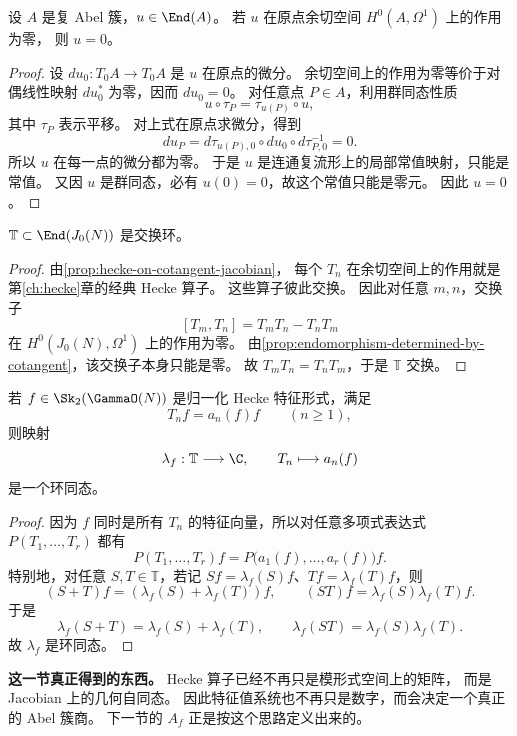 \begin{proposition}
\label{prop:endomorphism-determined-by-cotangent}
设 $A$ 是复 Abel 簇，$u\in\End(A)$。
若 $u$ 在原点余切空间 $H^0(A,\Omega^1)$ 上的作用为零，
则 $u=0$。
\end{proposition}

\begin{proof}
设 $du_0:T_0A\to T_0A$ 是 $u$ 在原点的微分。
余切空间上的作用为零等价于对偶线性映射 $du_0^*$ 为零，因而 $du_0=0$。
对任意点 $P\in A$，利用群同态性质
\[
  u\circ \tau_P=\tau_{u(P)}\circ u,
\]
其中 $\tau_P$ 表示平移。
对上式在原点求微分，得到
\[
  du_P=d\tau_{u(P),0}\circ du_0\circ d\tau_{P,0}^{-1}=0.
\]
所以 $u$ 在每一点的微分都为零。
于是 $u$ 是连通复流形上的局部常值映射，只能是常值。
又因 $u$ 是群同态，必有 $u(0)=0$，故这个常值只能是零元。
因此 $u=0$。
\end{proof}

\begin{corollary}
\label{cor:hecke-algebra-commutative-jacobian}
$\mathbb T\subset \End(J_0(N))$ 是交换环。
\end{corollary}

\begin{proof}
由\cref{prop:hecke-on-cotangent-jacobian}，
每个 $T_n$ 在余切空间上的作用就是第\ref{ch:hecke}章的经典 Hecke 算子。
这些算子彼此交换。
因此对任意 $m,n$，交换子
\[
  [T_m,T_n]=T_mT_n-T_nT_m
\]
在 $H^0(J_0(N),\Omega^1)$ 上的作用为零。
由\cref{prop:endomorphism-determined-by-cotangent}，该交换子本身只能是零。
故 $T_mT_n=T_nT_m$，于是 $\mathbb T$ 交换。
\end{proof}

\begin{proposition}
\label{prop:eigenform-gives-character}
若 $f\in \Sk_2(\GammaO(N))$ 是归一化 Hecke 特征形式，满足
\[
  T_nf=a_n(f)f \qquad (n\ge 1),
\]
则映射
\[
  \lambda_f:\mathbb T\longrightarrow \C,
  \qquad
  T_n\longmapsto a_n(f)
\]
是一个环同态。
\end{proposition}

\begin{proof}
因为 $f$ 同时是所有 $T_n$ 的特征向量，所以对任意多项式表达式 $P(T_1,\dots,T_r)$ 都有
\[
  P(T_1,\dots,T_r)f=P\bigl(a_1(f),\dots,a_r(f)\bigr)f.
\]
特别地，对任意 $S,T\in\mathbb T$，若记 $Sf=\lambda_f(S)f$、$Tf=\lambda_f(T)f$，则
\[
  (S+T)f=(\lambda_f(S)+\lambda_f(T))f,
  \qquad
  (ST)f=\lambda_f(S)\lambda_f(T)f.
\]
于是
\[
  \lambda_f(S+T)=\lambda_f(S)+\lambda_f(T),
  \qquad
  \lambda_f(ST)=\lambda_f(S)\lambda_f(T).
\]
故 $\lambda_f$ 是环同态。
\end{proof}

\textbf{这一节真正得到的东西。}
Hecke 算子已经不再只是模形式空间上的矩阵，
而是 Jacobian 上的几何自同态。
因此特征值系统也不再只是数字，而会决定一个真正的 Abel 簇商。
下一节的 $A_f$ 正是按这个思路定义出来的。
